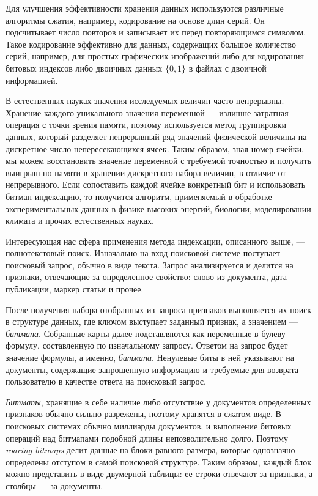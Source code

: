 Для улучшения эффективности хранения данных используются различные алгоритмы
сжатия, например, кодирование на основе длин серий. Он подсчитывает число повторов и
записывает их перед повторяющимся символом. Такое кодирование эффективно для
данных, содержащих большое количество серий, например, для простых графических
изображений либо для кодирования битовых индексов либо двоичных данных
$\{0, 1\}$ в файлах с двоичной информацией.

В естественных науках значения исследуемых величин часто непрерывны. Хранение
каждого уникального значения переменной — излишне затратная операция с точки
зрения памяти, поэтому используется метод группировки данных, который разделяет
непрерывный ряд значений физической величины на
дискретное число непересекающихся ячеек. Таким образом, зная номер ячейки, мы
можем восстановить значение переменной с требуемой точностью и получить выигрыш
по памяти в хранении дискретного набора величин, в отличие от непрерывного.
Если сопоставить каждой ячейке конкретный бит и использовать битмап индексацию,
то получится алгоритм, применяемый в обработке экспериментальных данных в физике
высоких энергий, биологии, моделировании климата и прочих естественных науках.

Интересующая нас сфера применения метода индексации, описанного выше, —
полнотекстовый поиск. Изначально на вход поисковой системе поступает поисковый
запрос, обычно в виде текста. Запрос анализируется и делится на признаки,
отвечающие за определенное свойство: слово из документа, дата публикации, маркер
статьи и прочее.

После получения набора отобранных из запроса признаков выполняется их поиск в
структуре данных, где ключом выступает заданный признак, а значением — \textit{битмапа}.
Собранные карты далее подставляются как переменные в булеву формулу,
составленную по изначальному запросу. Ответом на запрос будет значение формулы,
а именно, \textit{битмапа}. Ненулевые биты в ней указывают на документы, содержащие
запрошенную информацию и требуемые для возврата пользователю в качестве
ответа на поисковый запрос.

\textit{Битмапы}, хранящие в себе наличие либо отсутствие у документов определенных
признаков обычно сильно разрежены, поэтому хранятся в сжатом виде. В поисковых
системах обычно миллиарды документов, и выполнение битовых операций над битмапами
подобной длины непозволительно долго. Поэтому \textit{roaring bitmaps}
\cite{Roaring:2018} делит данные на блоки равного размера, которые однозначно
определены отступом в самой поисковой структуре. Таким образом, каждый блок можно
представить в виде двумерной таблицы: ее строки отвечают за признаки,
а столбцы — за документы.\label{table}

